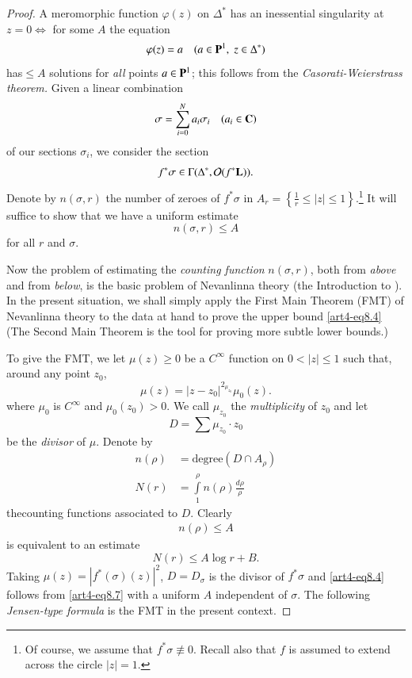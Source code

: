 \begin{proof}
A meromorphic function $\varphi (z)$ on $\Delta^\ast$ has an inessential singularity at $z =0 \Leftrightarrow $  for some $A$ the equation
$$
\varphi (z) = a \quad (a \in\mathbf{P}^1, \; z \in \Delta^\ast)
$$
has\pageoriginale $\leqslant A$ solutions for \textit{all} points $a \in \mathbf{P}^1$; this follows from the \textit{Casorati-Weierstrass theorem.} Given a linear combination
$$
\sigma = \sum\limits^N_{i=0} a_i \sigma_i \quad (a_i \in \mathbf{C})
$$
of our sections $\sigma_i$, we consider the section
$$
f^\ast \sigma \in \Gamma (\Delta^\ast, \mathcal{O} (f^\ast \mathbf{L})).
$$
Denote by $n (\sigma, r)$ the number of zeroes of $f^\ast \sigma$ in $A_r = \left\{\frac{1}{r} \leqslant |z| \leqslant 1 \right\}$.\footnote[35]{Of course, we assume that $f^\ast \sigma \not\equiv 0$. Recall also that $f$ is assumed to extend across the circle $|z| =1$.} It will suffice to show that we have a uniform estimate
\begin{equation}
n(\sigma, r) \leqslant A\label{art4-eq8.4} 
\end{equation}
for all $r$ and $\sigma$.

Now the problem of estimating the \textit{counting function} $n (\sigma, r)$, both from \textit{above} and from \textit{below}, is the basic problem of Nevanlinna theory (\cf the Introduction to \cite{art4-key24}). In the present situation, we shall simply apply the First Main Theorem (FMT) of Nevanlinna theory to the data at hand to prove the upper bound \eqref{art4-eq8.4} (The Second Main Theorem is the tool for proving more subtle lower bounds.)

To give the FMT, we let $\mu(z) \geqslant 0$ be a $C^\infty$ function on $0 < |z| \leqslant 1$ such that, around any point $z_0$,
\begin{equation}
\mu(z) = |z - z_0|^{2_{\mu_{z_0}}} \mu_0 (z).
\label{art4-eq8.5}
\end{equation}
where $\mu_0$ is $C^\infty$ and $\mu_0 (z_0) > 0$. We call $\mu_{z_0}$ the \textit{multiplicity} of $z_0$ and let 
$$
D = \sum \mu_{z_0} \cdot z_0
$$
be the \textit{divisor} of $\mu$. Denote by 
\begin{align*}
n (\rho) & = \text{degree} (D \cap A_\rho)\\
N(r) & = \int\limits^\rho_1 n (\rho) \frac{d\rho}{\rho}
 \end{align*}
the\pageoriginale counting functions associated to $D$. Clearly
\begin{align}
n (\rho) \leqslant A \label{art4-eq8.6}
\end{align}
is equivalent to an estimate
\begin{equation}
N(r) \leqslant A \log r + B. \label{art4-eq8.7}
\end{equation}
Taking $\mu(z) = |f^\ast (\sigma) (z)|^2$, $D = D_\sigma$ is the divisor of $f^\ast \sigma$ and \eqref{art4-eq8.4} follows from \eqref{art4-eq8.7} with a uniform $A$ independent of $\sigma$. The following \textit{Jensen-type formula} is the FMT in the present context.
\end{proof}

